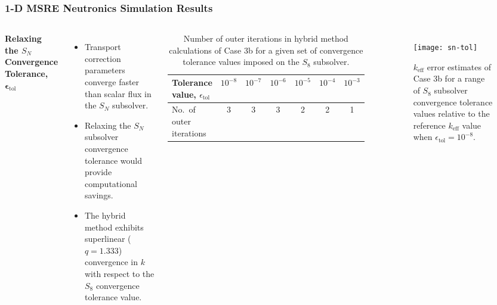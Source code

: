 \begin{frame}
  \frametitle{1-D MSRE Neutronics Simulation Results}
  \begin{columns}
    \column{6.5cm}
    \textbf{Relaxing the $S_N$ Convergence Tolerance,} $\bm{\epsilon}_\text{tol}$
    \begin{itemize}
      \item Transport correction parameters converge faster than scalar flux in the $S_N$ subsolver.
      \item Relaxing the $S_N$ subsolver convergence tolerance would provide computational savings.
      \item The hybrid method exhibits superlinear ($q=1.333$) convergence in $k$ with respect to
        the $S_8$ convergence tolerance value.
    \end{itemize}
    \begin{table}[h]
      \centering
      \caption{Number of outer iterations in hybrid method calculations of Case 3b for a given set of
      convergence tolerance values imposed on the $S_8$ subsolver.}
      \small
      \setlength\tabcolsep{2pt}
      \begin{tabular}{l S S S S S S}
        \toprule
        Tolerance value, $\epsilon_\text{tol}$ & {$10^{-8}$} & {$10^{-7}$} & {$10^{-6}$} & {$10^{-5}$} & {$10^{-4}$} & {$10^{-3}$} \\
        \midrule
        No.\ of outer iterations & 3 & 3 & 3 & 2 & 2 & 1 \\
        \bottomrule
      \end{tabular}
      \label{table:sn-tol}
    \end{table}
    \column{4.5cm}
    \begin{figure}[h]
      \centering
      \texttt{[image: sn-tol]}
      \caption{$k_\text{eff}$ error estimates of Case 3b for a range of $S_8$ subsolver convergence tolerance values
      relative to the reference $k_\text{eff}$ value when
      $\epsilon_\text{tol}=10^{-8}$.}
      \label{fig:sn-tol}
    \end{figure}
  \end{columns}
\end{frame}

